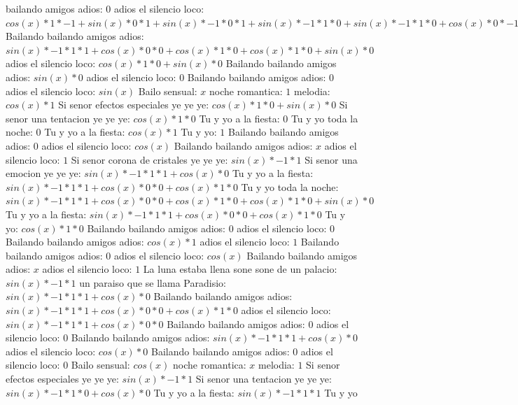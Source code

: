 \documentclass{article}
\begin{document}
bailando amigos adios: $0$  \newline adios el silencio loco: ${{{cos(x)*1*-1+sin(x)*0}*1+sin(x)*-1*0}*1+sin(x)*-1*1*0+sin(x)*-1*1*0+cos(x)*0}*-1+{sin(x)*-1*1*1+cos(x)*0}*0+{sin(x)*-1*1*1+cos(x)*0}*0+cos(x)*1*0+{sin(x)*-1*1*1+cos(x)*0}*0+cos(x)*1*0+cos(x)*1*0+sin(x)*0$  \newline Bailando bailando amigos adios: ${sin(x)*-1*1*1+cos(x)*0}*0+cos(x)*1*0+cos(x)*1*0+sin(x)*0$  \newline adios el silencio loco: $cos(x)*1*0+sin(x)*0$  \newline Bailando bailando amigos adios: $sin(x)*0$ adios el silencio loco: $0$ Bailando bailando amigos adios: $0$  \newline adios el silencio loco: $sin(x)$  \newline Bailo sensual: $x$ noche romantica: $1$  \newline melodia: $cos(x)*1$ Si senor efectos especiales ye ye ye: $cos(x)*1*0+sin(x)*0$ Si senor una tentacion ye ye ye: $cos(x)*1*0$ Tu y yo a la fiesta: $0$ Tu y yo toda la noche: $0$  \newline Tu y yo a la fiesta: $cos(x)*1$ Tu y yo: $1$ Bailando bailando amigos adios: $0$  \newline adios el silencio loco: $cos(x)$  \newline Bailando bailando amigos adios: $x$ adios el silencio loco: $1$  \newline Si senor corona de cristales ye ye ye: $sin(x)*-1*1$ Si senor una emocion ye ye ye: $sin(x)*-1*1*1+cos(x)*0$ Tu y yo a la fiesta: ${sin(x)*-1*1*1+cos(x)*0}*0+cos(x)*1*0$ Tu y yo toda la noche: ${sin(x)*-1*1*1+cos(x)*0}*0+cos(x)*1*0+cos(x)*1*0+sin(x)*0$ Tu y yo a la fiesta: ${sin(x)*-1*1*1+cos(x)*0}*0+cos(x)*1*0$  \newline Tu y yo: $cos(x)*1*0$ Bailando bailando amigos adios: $0$ adios el silencio loco: $0$  \newline Bailando bailando amigos adios: $cos(x)*1$ adios el silencio loco: $1$ Bailando bailando amigos adios: $0$  \newline adios el silencio loco: $cos(x)$  \newline Bailando bailando amigos adios: $x$ adios el silencio loco: $1$  \newline La luna estaba llena sone sone de un palacio: $sin(x)*-1*1$ un paraiso que se llama Paradisio: $sin(x)*-1*1*1+cos(x)*0$ Bailando bailando amigos adios: ${sin(x)*-1*1*1+cos(x)*0}*0+cos(x)*1*0$ adios el silencio loco: ${sin(x)*-1*1*1+cos(x)*0}*0$ Bailando bailando amigos adios: $0$ adios el silencio loco: $0$  \newline Bailando bailando amigos adios: $sin(x)*-1*1*1+cos(x)*0$  \newline adios el silencio loco: $cos(x)*0$ Bailando bailando amigos adios: $0$ adios el silencio loco: $0$  \newline Bailo sensual: $cos(x)$  \newline noche romantica: $x$ melodia: $1$  \newline Si senor efectos especiales ye ye ye: $sin(x)*-1*1$ Si senor una tentacion ye ye ye: $sin(x)*-1*1*0+cos(x)*0$ Tu y yo a la fiesta: $sin(x)*-1*1*1$ Tu y yo 
\end{document}
